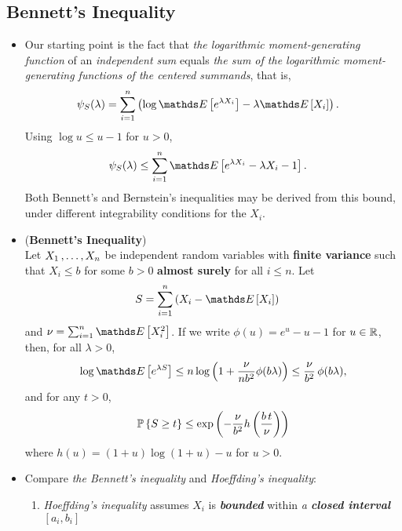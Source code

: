 \documentclass[11pt]{article}
\begin{document}
\subsection{Bennett's Inequality}
\begin{itemize}
\item \begin{remark}
Our starting point is the fact that  \emph{the logarithmic moment-generating function} of an \emph{independent sum} equals \emph{the sum of the logarithmic moment-generating functions of the centered summands}, that is,
\begin{align*}
\psi_{S}(\lambda) &=  \sum_{i=1}^{n}\paren{\log\E{}{e^{\lambda X_i}} - \lambda \E{}{X_i}}.
\end{align*}
Using $\log u \le u - 1$ for $u > 0$,
\begin{align}
\psi_{S}(\lambda) &\le \sum_{i=1}^{n}\E{}{e^{\lambda X_i} - \lambda X_i - 1}. \label{ineqn: log_mgf_bound}
\end{align}
Both Bennett's and Bernstein's inequalities may be derived from this bound, under different integrability conditions for the $X_i$.
\end{remark}

\item \begin{proposition} (\textbf{Bennett's Inequality}) \citep{boucheron2013concentration}\\
Let $X_1 \,{,}\ldots{,}\, X_n$ be independent random variables with \textbf{finite variance} such that $X_i \le b$ for some $b > 0$ \textbf{almost surely} for all $i \le n$. Let
\begin{align*}
S &= \sum_{i=1}^{n}\paren{X_i - \E{}{X_i}}
\end{align*} and $\nu = \sum_{i=1}^{n}\E{}{X_i^2}$. If we write $\phi(u) = e^u - u - 1$ for $u \in {\mathbb R}$, then, for all $\lambda > 0$,
\begin{align*}
\log \E{}{e^{\lambda S}} \le n \log\paren{1 + \frac{\nu}{n b^2}\phi(b \lambda)} \le \frac{\nu}{b^2}\,\phi(b\lambda),
\end{align*}
and for any $t > 0$,
\begin{align}
{\mathbb P}\left\{S \ge t\right\} \le \exp\left(-\frac{\nu}{b^2}h\left(\frac{b\,t}{\nu}\right)\right) \label{ineqn: bennett_inequality}
\end{align}
where $h(u) = (1 + u) \log(1 + u) - u$ for $u > 0$.
\end{proposition}

\item \begin{remark}
Compare \emph{the Bennett's inequality} and \emph{Hoeffding's inequality}:
\begin{enumerate}
\item \emph{Hoeffding's inequality} assumes $X_i$ is \emph{\textbf{bounded}} within \emph{a \textbf{closed interval}} $[a_i, b_i]$


\end{enumerate}
\end{remark}
\end{itemize}
\end{document}
